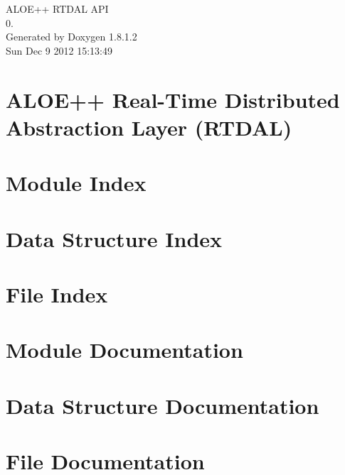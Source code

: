 \documentclass{book}
\begin{document}
\begin{titlepage}
\vspace*{7cm}
\begin{center}
{\Large A\-L\-O\-E++ R\-T\-D\-A\-L A\-P\-I \\[1ex]\large 0. }\\
\vspace*{1cm}
{\large Generated by Doxygen 1.8.1.2}\\
\vspace*{0.5cm}
{\small Sun Dec 9 2012 15:13:49}\\
\end{center}
\end{titlepage}
\clearemptydoublepage
{}
\tableofcontents
\clearemptydoublepage
{}
\chapter{A\-L\-O\-E++ Real-\/\-Time Distributed Abstraction Layer (R\-T\-D\-A\-L)}
\label{index}
\chapter{Module Index}

\chapter{Data Structure Index}

\chapter{File Index}

\chapter{Module Documentation}










\chapter{Data Structure Documentation}





\chapter{File Documentation}



\printindex
\end{document}
